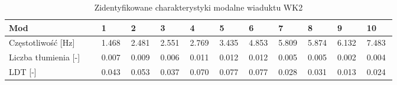 \begin{table}[hbt!]
	\caption{Zidentyfikowane charakterystyki modalne wiaduktu WK2}
	\label{tab: wk2_ident_mods}
	\footnotesize
	\setlength\tabcolsep{0pt}
	\begin{tabular}{@{} p{0.22\linewidth}  *{10}{P{0.078\linewidth}} @{}}
	\toprule
	Mod  & 1 & 2 & 3 & 4 & 5 & 6 & 7 & 8 & 9 & 10 \\ \midrule
	Częstotliwość {[}Hz{]}   & 1.468          & 2.481          & 2.551          & 2.769          & 3.435          & 4.853          & 5.809          & 5.874          & 6.132          & 7.483           \\ \midrule
	Liczba tłumienia {[}-{]} & 0.007          & 0.009          & 0.006          & 0.011          & 0.012          & 0.012          & 0.005          & 0.005          & 0.002          & 0.004           \\ \midrule
	LDT {[}-{]}              & 0.043          & 0.053          & 0.037          & 0.070          & 0.077          & 0.077          & 0.028          & 0.031          & 0.013          & 0.024           \\ \bottomrule
\end{tabular}
\end{table}


\clearpage


